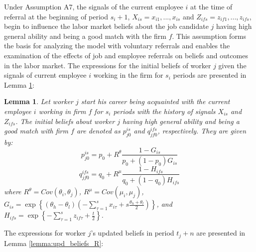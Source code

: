\documentclass[12pt]{article}
\newtheorem{lemma}{Lemma}
\begin{document}
Under Assumption A7, the signals of the current employee $i$ at the time of referral at the beginning of period $s_i+1$, $X_{is} = {x_{i1}, ..., x_{is}}$ and $Z_{ifs} = {z_{if1}, ..., z_{ifs}}$, begin to influence the labor market beliefs about the job candidate $j$ having high general ability and being a good match with the firm $f$. This assumption forms the basis for analyzing the model with voluntary referrals and enables the examination of the effects of job and employee referrals on beliefs and outcomes in the labor market. The expressions for the initial beliefs of worker $j$ given the signals of current employee $i$ working in the firm for $s_i$ periods are presented in Lemma \ref{lemma:init_beliefs_R}:

\begin{lemma}\label{lemma:init_beliefs_R}
Let worker $j$ start his career being acquainted with the current employee $i$ working in firm $f$ for $s_i$ periods with the history of signals $X_{is}$ and $Z_{ifs}$. The initial beliefs about worker $j$ having high general ability and being a good match with firm $f$ are denoted as $p_{j0}^{is}$ and $q_{jf0}^{ifs}$, respectively. They are given by:
    \begin{equation}\label{eq:p_j0_is}
    p_{j0}^{is} = p_0 + R^\theta \frac{1-G_{is}}{p_0 + (1-p_0)G_{is}}
    \end{equation}
    \begin{equation}\label{eq:q_j0_is}
        q_{jf0}^{ifs} = q_0 + R^\mu \frac{1-H_{ifs}}{q_0 + (1-q_0)H_{ifs}}
    \end{equation}
    where $R^\theta = Cov(\theta_i, \theta_j)$, $R^\mu = Cov(\mu_i, \mu_j)$, $G_{is} = \exp \left\lbrace (\theta_h - \theta_l)(-\sum_{\tau = 1}^{s}x_{i\tau} + s\frac{\theta_h + \theta_l}{2}) \right \rbrace$, and $H_{ifs} = \exp \left\lbrace -\sum_{\tau = 1}^{s}z_{if\tau}+\frac{t}{2}\right\rbrace$.
\end{lemma}

The expressions for worker $j$'s updated beliefs in period $t_j+n$ are presented in Lemma \ref{lemma:upd_beliefs_R}:
\end{document}
